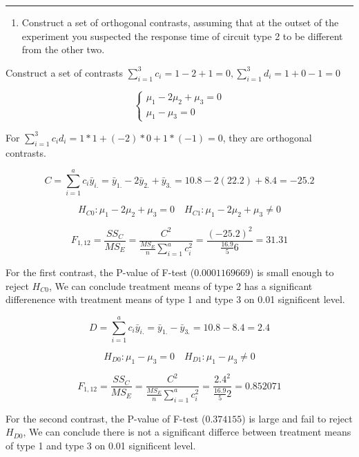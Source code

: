 \documentclass[]{article}
\providecommand{\tightlist}{%
  \setlength{\itemsep}{0pt}\setlength{\parskip}{0pt}}
\begin{document}
\begin{center}\rule{0.5\linewidth}{\linethickness}\end{center}

\begin{enumerate}
\def\labelenumi{(\alph{enumi})}
\setcounter{enumi}{3}
\tightlist
\item
  Construct a set of orthogonal contrasts, assuming that at the outset
  of the experiment you suspected the response time of circuit type 2 to
  be different from the other two.
\end{enumerate}

Construct a set of contrasts
\(\sum_{i=1}^3c_i=1-2+1=0,\sum_{i=1}^3d_i=1+0-1=0\)

\[\begin{cases}\mu_1-2\mu_2+\mu_3=0\\\mu_1-\mu_3=0\end{cases}\]

For \(\sum_{i=1}^3c_id_i=1*1+(-2)*0+1*(-1)=0\), they are orthogonal
contrasts.

\[C=\sum_{i=1}^ac_i\bar y_{i.}=\bar y_{1.}-2\bar y_{2.}+\bar y_{3.}=10.8-2(22.2)+8.4=-25.2\]

\[H_{C0}:\mu_1-2\mu_2+\mu_3=0\quad H_{C1}:\mu_1-2\mu_2+\mu_3\neq0\]

\[F_{1,12}=\frac{SS_C}{MS_E}=\frac{C^2}{\frac{MS_E}n\sum_{i=1}^ac_i^2}=\frac{(-25.2)^2}{\frac{16.9}56}=31.31\]

For the first contrast, the P-value of F-test (\(0.0001169669\)) is
small enough to reject \(H_{C0}\), We can conclude treatment means of
type 2 has a significant differenence with treatment means of type 1 and
type 3 on 0.01 significent level.

\[D=\sum_{i=1}^ac_i\bar y_{i.}=\bar y_{1.}-\bar y_{3.}=10.8-8.4=2.4\]

\[H_{D0}:\mu_1-\mu_3=0\quad H_{D1}:\mu_1-\mu_3\neq0\]

\[F_{1,12}=\frac{SS_C}{MS_E}=\frac{C^2}{\frac{MS_E}n\sum_{i=1}^ac_i^2}=\frac{2.4^2}{\frac{16.9}52}=0.852071\]

For the second contrast, the P-value of F-test (\(0.374155\)) is large
and fail to reject \(H_{D0}\), We can conclude there is not a
significant differce between treatment means of type 1 and type 3 on
0.01 significent level.
\end{document}
